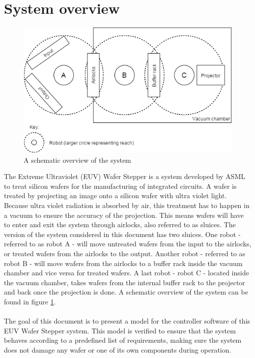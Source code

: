\documentclass[12pt]{report}
\begin{document}
	\section{System overview}
	\begin{figure}
		\centering
		\includegraphics[scale=0.7]{systemmodel}
		\caption{A schematic overview of the system}
		\label{fig:overview}
	\end{figure}
	The Extreme Ultraviolet (EUV) Wafer Stepper is a system developed by ASML to treat silicon wafers for the manufacturing of integrated circuits. A wafer is treated by projecting an image onto a silicon wafer with ultra violet light. Because ultra violet radiation is absorbed by air, this treatment has to happen in a vacuum to ensure the accuracy of the projection. This means wafers will have to enter and exit the system through airlocks, also referred to as sluices. The version of the system considered in this document has two sluices. One robot - referred to as robot A - will move untreated wafers from the input to the airlocks, or treated wafers from the airlocks to the output. Another robot - referred to as robot B - will move wafers from the airlocks to a buffer rack inside the vacuum chamber and vice versa for treated wafers. A last robot - robot C - located inside the vacuum chamber, takes wafers from the internal buffer rack to the projector and back once the projection is done. A schematic overview of the system can be found in figure \ref{fig:overview}.\\
	\\
	The goal of this document is to present a model for the controller software of this EUV Wafer Stepper system. This model is verified to ensure that the system behaves according to a predefined list of requirements, making sure the system does not damage any wafer or one of its own components during operation.
\end{document}
